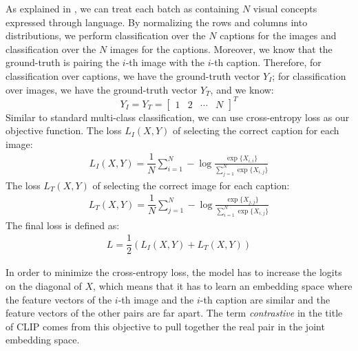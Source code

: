 As explained in \cite{CLIPpaper}, we can treat each batch as containing $N$ visual concepts expressed through language.
By normalizing the rows and columns into distributions, we perform classification over the $N$ captions for the images and classification over the $N$ images for the captions.  
Moreover, we know that the ground-truth is pairing the $i$-th image with the $i$-th caption.   
Therefore, for classification over captions, we have the ground-truth vector $Y_I$; for classification over images, we have the ground-truth vector $Y_T$, and we know: 
$$Y_I = Y_T = \begin{bmatrix}1 & 2 & \cdots & N \end{bmatrix}^T $$ 
Similar to standard multi-class classification, we can use cross-entropy loss as our objective function. The loss $L_I(X, Y)$ of selecting the correct caption for each image:
\begin{equation} \label{cliploss.image}
\begin{split}
    L_I(X, Y) = \dfrac{1}{N} \sum_{i=1}^N -\log\frac{\exp\{ {X}_{i,i} \}}{ \sum_{j=1}^N \exp\{ {X}_{i,j} \} }
\end{split}
\end{equation}
The loss $L_T(X, Y)$ of selecting the correct image for each caption:
\begin{equation} \label{cliploss.text}
\begin{split}
    L_T(X, Y) = \dfrac{1}{N} \sum_{j=1}^N -\log\frac{\exp\{ {X}_{j,j} \}}{ \sum_{i=1}^N \exp\{ {X}_{i,j} \} }
\end{split}
\end{equation}
The final loss is defined as:
\begin{equation} \label{cliploss.all}
\begin{split}
    L = \dfrac{1}{2} (L_I(X, Y) + L_T(X, Y))
\end{split}
\end{equation}

In order to minimize the cross-entropy loss, the model has to increase the logits on the diagonal of $X$, which means that it has to learn an embedding space where the feature vectors of the $i$-th image and the $i$-th caption are similar and the feature vectors of the other pairs are far apart. The term \textit{contrastive} in the title of CLIP comes from this objective to pull together the real pair in the joint embedding space.    

